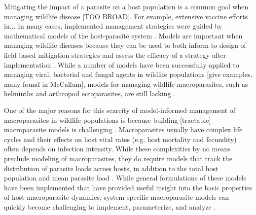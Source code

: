 \documentclass[11pt]{article}
\begin{document}


Mitigating the impact of a parasite on a host population is a common goal when managing wildlife disease [TOO BROAD]. For example, extensive vaccine efforts in...  In many cases, implemented management strategies were guided by mathematical models of the host-parasite system \citep[e.g.][]{Restif2012,McCallum2017}.  Models are important when managing wildlife diseases because they can be used to both inform to design of field-based mitigation strategies and assess the efficacy of a strategy after implementation \citep{Restif2012}.  While a number of models have been successfully applied to managing viral, bacterial and fungal agents in wildlife populations [give examples, many found in McCallum], models for managing wildlife macroparasites, such as helminths and arthropod ectoparasites, are still lacking \citep[][, but see X X X for macroparasite models in livestock]{McCallum2017}.

One of the major reasons for this scarcity of model-informed management of macroparasites in wildlife populations is because building [tractable] macroparasite models is challenging \citep{Hollingsworth2015,McCallum2017}. Macroparasites usually have complex life cycles and their effects on host vital rates (e.g. host mortality and fecundity) often depends on infection intensity.  While these complexities by no means preclude modeling of macroparasites, they do require models that track the distribution of parasite loads across hosts, in addition to the total host population and mean parasite load \citep{AndersonandMay1978,Cornell2010}.  While general formulations of these models have been implemented that have provided useful insight into the basic properties of host-macroparasite dynamics, system-specific macroparasite models can quickly become challenging to implement, parameterize, and analyze \citep{Hollingsworth2015,McCallum2017}.
\end{document}
